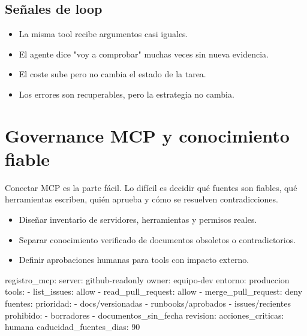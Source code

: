 \documentclass[11pt,a4paper]{book}
\begin{document}
\section{Señales de loop}
\begin{itemize}\item La misma tool recibe argumentos casi iguales.\end{itemize}
\begin{itemize}\item El agente dice "voy a comprobar" muchas veces sin nueva evidencia.\end{itemize}
\begin{itemize}\item El coste sube pero no cambia el estado de la tarea.\end{itemize}
\begin{itemize}\item Los errores son recuperables, pero la estrategia no cambia.\end{itemize}
\chapter{Governance MCP y conocimiento fiable}
Conectar MCP es la parte fácil. Lo difícil es decidir qué fuentes son fiables, qué herramientas escriben, quién aprueba y cómo se resuelven contradicciones.

\begin{itemize}\item Diseñar inventario de servidores, herramientas y permisos reales.\end{itemize}
\begin{itemize}\item Separar conocimiento verificado de documentos obsoletos o contradictorios.\end{itemize}
\begin{itemize}\item Definir aprobaciones humanas para tools con impacto externo.\end{itemize}
\begin{codebox}
registro_mcp:
  server: github-readonly
  owner: equipo-dev
  entorno: produccion
  tools:
    - list_issues: allow
    - read_pull_request: allow
    - merge_pull_request: deny
  fuentes:
    prioridad:
      - docs/versionadas
      - runbooks/aprobados
      - issues/recientes
    prohibido:
      - borradores
      - documentos_sin_fecha
  revision:
    acciones_criticas: humana
    caducidad_fuentes_dias: 90
\end{codebox}
\end{document}
